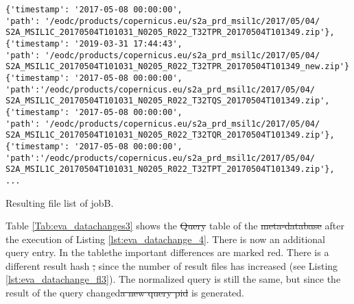 \documentclass[draft,final]{vutinfth} %
\newenvironment{code}{\captionsetup{type=listing}}{}
\providecommand{\DIFaddtex}[1]{{\protect\color{blue}\uwave{#1}}} %
\providecommand{\DIFdeltex}[1]{{\protect\color{red}\sout{#1}}}                      %
\providecommand{\DIFaddbegin}{} %
\providecommand{\DIFaddend}{} %
\providecommand{\DIFdelbegin}{} %
\providecommand{\DIFdelend}{} %
\providecommand{\DIFadd}[1]{\texorpdfstring{\DIFaddtex{#1}}{#1}} %
\providecommand{\DIFdel}[1]{\texorpdfstring{\DIFdeltex{#1}}{}} %
\begin{document}
\begin{enumerate}
	\begin{code}
		\begin{verbatim}
{'timestamp': '2017-05-08 00:00:00', 
'path': '/eodc/products/copernicus.eu/s2a_prd_msil1c/2017/05/04/
S2A_MSIL1C_20170504T101031_N0205_R022_T32TPR_20170504T101349.zip'}, 
{'timestamp': '2019-03-31 17:44:43', 
'path': '/eodc/products/copernicus.eu/s2a_prd_msil1c/2017/05/04/
S2A_MSIL1C_20170504T101031_N0205_R022_T32TPR_20170504T101349_new.zip'}
{'timestamp': '2017-05-08 00:00:00',
'path':'/eodc/products/copernicus.eu/s2a_prd_msil1c/2017/05/04/
S2A_MSIL1C_20170504T101031_N0205_R022_T32TQS_20170504T101349.zip', 
{'timestamp': '2017-05-08 00:00:00', 
'path': '/eodc/products/copernicus.eu/s2a_prd_msil1c/2017/05/04/
S2A_MSIL1C_20170504T101031_N0205_R022_T32TQR_20170504T101349.zip'}, 
{'timestamp': '2017-05-08 00:00:00',
'path':'/eodc/products/copernicus.eu/s2a_prd_msil1c/2017/05/04/
S2A_MSIL1C_20170504T101031_N0205_R022_T32TPT_20170504T101349.zip'},
...
		\end{verbatim}
		\caption{Resulting file list of jobB.}
		\label{lst:eva_datachange_fl3}
	\end{code}

	Table \ref{Tab:eva_datachanges3} shows the \DIFdelbegin \DIFdel{Query }\DIFdelend \DIFaddbegin \textit{\DIFadd{Query}} \DIFaddend table of the \DIFdelbegin \DIFdel{meta-database }\DIFdelend \DIFaddbegin \DIFadd{database }\DIFaddend after the execution of Listing \ref{lst:eva_datachange_4}. There is now an additional query entry. In the table\DIFaddbegin \DIFadd{, }\DIFaddend the important differences are marked red. There is a different result hash \DIFdelbegin \DIFdel{, }\DIFdelend since the number of result files has increased (see Listing \ref{lst:eva_datachange_fl3}). The normalized query is still the same, but since the result of the query changed\DIFdelbegin \DIFdel{a new query pid }\DIFdelend \DIFaddbegin \DIFadd{, a new data PID }\DIFaddend is generated. 


\end{enumerate}
\end{document}
